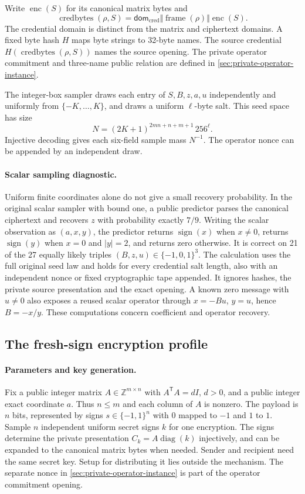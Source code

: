 Write \(\operatorname{enc}(S)\) for its canonical matrix bytes and
\[
 \operatorname{credbytes}(\rho,S)
   =\mathsf{dom}_{\mathrm{cred}}\Vert
     \operatorname{frame}(\rho)\Vert\operatorname{enc}(S).
\]
The credential domain is distinct from the matrix and ciphertext domains.
A fixed byte hash \(H\) maps byte strings to 32-byte names. The source
credential \(H(\operatorname{credbytes}(\rho,S))\) names the source opening.
The private operator commitment and three-name public relation are defined
in \cref{sec:private-operator-instance}.

The integer-box sampler draws each entry of \(S,B,z,a,u\) independently
and uniformly from \(\{-K,\ldots,K\}\), and draws a uniform \(\ell\)-byte
salt. This seed space has size
\[
 N=(2K+1)^{2mn+n+m+1}\,256^\ell.
\]
Injective decoding gives each six-field sample mass \(N^{-1}\). The
operator nonce can be appended by an independent draw.

\paragraph{Scalar sampling diagnostic.}
Uniform finite coordinates alone do not give a small recovery probability.
In the original scalar sampler with bound one, a public predictor parses the
canonical ciphertext and recovers \(z\) with probability exactly \(7/9\).
Writing the scalar observation as \((a,x,y)\), the predictor returns
\(\operatorname{sign}(x)\) when \(x\ne0\), returns
\(\operatorname{sign}(y)\) when \(x=0\) and \(|y|=2\), and returns zero
otherwise. It is correct on 21 of the 27 equally likely triples
\((B,z,u)\in\{-1,0,1\}^3\). The calculation uses the full original seed law
and holds for every credential salt length, also with an independent nonce
or fixed cryptographic tape appended. It ignores hashes, the private source
presentation and the exact opening. A known zero message with \(u\ne0\)
also exposes a reused scalar operator through \(x=-Bu\), \(y=u\), hence
\(B=-x/y\). These computations concern coefficient and operator recovery.

\subsection{The fresh-sign encryption profile}
\label{sec:coupled-sampling}

\paragraph{Parameters and key generation.}
Fix a public integer matrix \(A\in\mathbb Z^{m\times n}\) with
\(A^{\mathsf T}A=dI\), \(d>0\), and a public integer exact coordinate \(a\).
Thus \(n\leq m\) and each column of \(A\) is nonzero. The payload is \(n\)
bits, represented by signs \(s\in\{-1,1\}^n\) with \(0\) mapped to \(-1\)
and \(1\) to \(1\). Sample \(n\) independent uniform secret signs \(k\) for
one encryption. The signs determine the private presentation
\(C_k=A\operatorname{diag}(k)\) injectively, and can be expanded to the
canonical matrix bytes when needed. Sender and recipient need the same
secret key. Setup for distributing it lies outside the mechanism. The
separate nonce in \cref{sec:private-operator-instance} is part of the
operator commitment opening.

